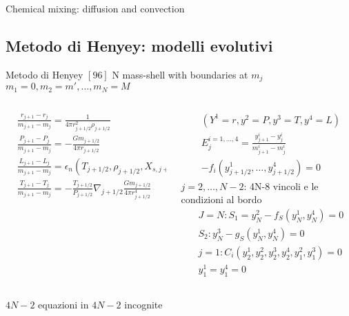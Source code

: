 \begin{frame}{Chemical mixing: diffusion and convection}

\end{frame}


\subsection{Metodo di Henyey: modelli evolutivi}

\begin{frame}{Metodo di Henyey $[96]$}
N mass-shell with boundaries at $m_j$ $m_1=0,m_2=m',\ldots,m_N=M$
\begin{columns}[T]
\begin{column}{0.5\textwidth}
\begin{align*}
&\frac{r_{j+1}-r_j}{m_{j+1}-m_j}=\frac{1}{4\pi r_{j+1/2}^2\rho_{j+1/2}}\\
&\frac{P_{j+1}-P_j}{m_{j+1}-m_j}=-\frac{Gm_{j+1/2}}{4\pi r_{j+1/2}}\\
&\frac{L_{j+1}-L_j}{m_{j+1}-m_j}=\epsilon_n(T_{j+1/2},\rho_{j+1/2},X_{s,j+1/2})+!!!\\
&\frac{T_{j+1}-T_j}{m_{j+1}-m_j}=-\frac{T_{j+1/2}}{P_{j+1/2}}\nabla_{j+1/2}\frac{Gm_{j+1/2}}{4\pi r^4_{j+1/2}}
\end{align*}
\end{column}
\begin{column}{0.5\textwidth}
\begin{align*}
&(Y^1=r, y^2=P, y^3=T, y^4=L)\\
&E_j^{i=1,\ldots,4}=\frac{y_{j+1}^i-y^i_j}{m_{j+1}^i-m^i_j}\\
&-f_i(y_{j+1/2}^1,\ldots,y_{j+1/2}^4)=0
\end{align*}
$j=2,\ldots,N-2$: 4N-8 vincoli e le condizioni al bordo
\begin{align*}
&J=N: S_1=y_N^2-f_S(y_N^1,y_N^4)=0\\
&S_2:y^3_N-g_S(y_N^1,y_N^4)=0\\
&j=1: C_i(y^1_2,y_2^2,y_2^3,y_2^4,y_1^2,y_1^3)=0\\
&y_1^1=y_1^4=0
\end{align*}
\end{column}
\end{columns}
$4N-2$ equazioni in $4N-2$ incognite
\end{frame}

